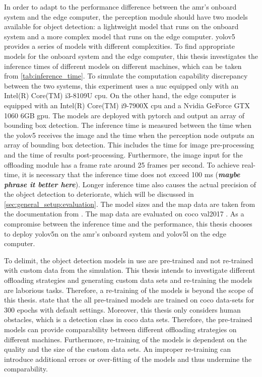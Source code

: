 In order to adapt to the performance difference between the \gls{amr}'s onboard system and the edge computer, the perception module should have two models available for object detection: a lightweight model that runs on the onboard system and a more complex model that runs on the edge computer. \gls{yolov5} provides a series of models with different complexities. To find appropriate models for the onboard system and the edge computer, this thesis investigates the inference times of different models on different machines, which can be taken from \cref{tab:inference_time}. To simulate the computation capability discrepancy between the two systems, this experiment uses a \gls{nuc} equipped only with an Intel(R) Core(TM) i3-8109U \gls{cpu}. On the other hand, the edge computer is equipped with an Intel(R) Core(TM) i9-7900X \gls{cpu} and a Nvidia GeForce GTX 1060 6GB \gls{gpu}. The models are deployed with \gls{pytorch} and output an array of bounding box detection. The inference time is measured between the time when the \gls{yolov5} receives the image and the time when the perception node outputs an array of bounding box detection. This includes the time for image pre-processing and the time of results post-processing. Furthermore, the image input for the offloading module has a frame rate around 25 frames per second. To achieve real-time, it is necessary that the inference time does not exceed 100 ms (\textbf{\textit{maybe phrase it better here}}). Longer inference time also causes the actual precision of the object detection to deteriorate, which will be discussed in \cref{sec:general_setup:evaluation}. The model sizes and the \gls{map} data are taken from the documentation from \citeauthor*{Jocher2022} \cite{Jocher2022}. The \gls{map} data are evaluated on \gls{coco} val2017 \cite{Lin2014}. As a compromise between the inference time and the performance, this thesis chooses to deploy \gls{yolov5}n on the \gls{amr}'s onboard system and \gls{yolov5}l on the edge computer. 

To delimit, the object detection models in use are pre-trained and not re-trained with custom data from the simulation. This thesis intends to investigate different offloading strategies and generating custom data sets and re-training the models are laborious tasks. Therefore, a re-training of the models is beyond the scope of this thesis. \citeauthor*{Jocher2022} \cite{Jocher2022} state that the all pre-trained models are trained on \gls{coco} data-sets for 300 epochs with default settings. Moreover, this thesis only considers human obstacles, which is a detection class in \gls{coco} data sets. Therefore, the pre-trained models can provide comparability between different offloading strategies on different machines. Furthermore, re-training of the models is dependent on the quality and the size of the custom data sets. An improper re-training can introduce additional errors or over-fitting of the models and thus undermine the comparability. 

